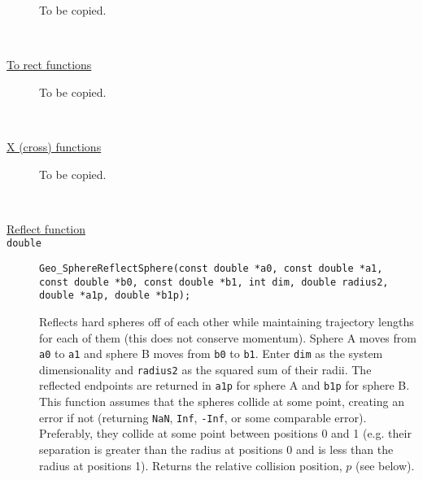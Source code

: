 \documentclass[11pt]{article}
\newcommand {\ttt} {\texttt}
\begin{document}
\begin{description}
To be copied.

\hfill \\
\item[\underline{To rect functions}]

To be copied.

\hfill \\
\item[\underline{X (cross) functions}]

To be copied.

\hfill \\
\item[\underline{Reflect function}]

\item[\ttt{double}]
\ttt{Geo\_SphereReflectSphere(const double *a0, const double *a1, const double *b0, const double *b1, int dim, double radius2, double *a1p, double *b1p);}

Reflects hard spheres off of each other while maintaining trajectory lengths for each of them (this does not conserve momentum). Sphere A moves from \ttt{a0} to \ttt{a1} and sphere B moves from \ttt{b0} to \ttt{b1}. Enter \ttt{dim} as the system dimensionality and \ttt{radius2} as the squared sum of their radii. The reflected endpoints are returned in \ttt{a1p} for sphere A and \ttt{b1p} for sphere B. This function assumes that the spheres collide at some point, creating an error if not (returning \ttt{NaN}, \ttt{Inf}, \ttt{-Inf}, or some comparable error). Preferably, they collide at some point between positions 0 and 1 (e.g. their separation is greater than the radius at positions 0 and is less than the radius at positions 1). Returns the relative collision position, $p$ (see below).


\end{description}
\end{document}
